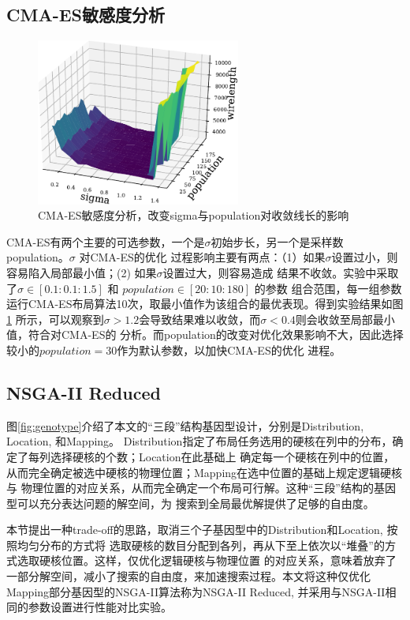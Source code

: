 \subsection{CMA-ES敏感度分析}

\begin{figure}[h]
	\centering
	\includegraphics[width=0.6\textwidth]{figure/cma_sensitivity-crop}
	\caption{CMA-ES敏感度分析，改变sigma与population对收敛线长的影响} 
	\label{fig:sensitivity}
\end{figure}

CMA-ES有两个主要的可选参数，一个是$\sigma$初始步长，另一个是采样数population。$\sigma$ 对CMA-ES的优化
过程影响主要有两点：（1）如果$\sigma$设置过小，则容易陷入局部最小值；(2) 如果$\sigma$设置过大，则容易造成
结果不收敛。实验中采取了$\sigma \in [0.1 : 0.1 : 1.5]$ 和 $population \in [20 : 10 : 180]$ 的参数
组合范围，每一组参数运行CMA-ES布局算法10次，取最小值作为该组合的最优表现。得到实验结果如图\ref{fig:sensitivity}
所示，可以观察到$\sigma > 1.2$会导致结果难以收敛，而$\sigma < 0.4$则会收敛至局部最小值，符合对CMA-ES的
分析。而population的改变对优化效果影响不大，因此选择较小的$population=30$作为默认参数，以加快CMA-ES的优化
进程。

\subsection{NSGA-II Reduced}

图\ref{fig:genotype}介绍了本文的“三段”结构基因型设计，分别是Distribution, Location, 和Mapping。
Distribution指定了布局任务选用的硬核在列中的分布，确定了每列选择硬核的个数；Location在此基础上
确定每一个硬核在列中的位置，从而完全确定被选中硬核的物理位置；Mapping在选中位置的基础上规定逻辑硬核与
物理位置的对应关系，从而完全确定一个布局可行解。这种“三段”结构的基因型可以充分表达问题的解空间，为
搜索到全局最优解提供了足够的自由度。

本节提出一种trade-off的思路，取消三个子基因型中的Distribution和Location, 按照均匀分布的方式将
选取硬核的数目分配到各列，再从下至上依次以“堆叠”的方式选取硬核位置。这样，仅优化逻辑硬核与物理位置
的对应关系，意味着放弃了一部分解空间，减小了搜索的自由度，来加速搜索过程。本文将这种仅优化
Mapping部分基因型的NSGA-II算法称为NSGA-II Reduced, 并采用与NSGA-II相同的参数设置进行性能对比实验。


